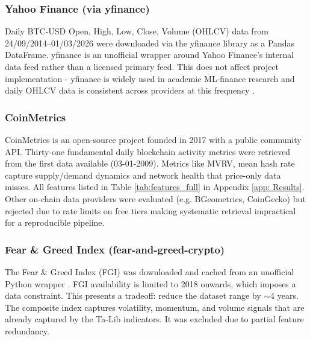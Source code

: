 \subsubsection{Yahoo Finance (via yfinance)}
\label{subsubsec: yfinance}
Daily BTC-USD Open, High, Low, Close, Volume (OHLCV) data from 24/09/2014–01/03/2026 were downloaded via the yfinance library as a Pandas DataFrame. yfinance is an unofficial wrapper around Yahoo Finance's internal data feed rather than a licensed primary feed. This does not affect project implementation - yfinance is widely used in academic ML-finance research and daily OHLCV data is consistent across providers at this frequency \cite{chenAnalysisBitcoinPrice2023}.
\subsubsection{CoinMetrics}
\label{subsubsec: CoinMetrics}
CoinMetrics is an open-source project founded in 2017 with a public community API. Thirty-one fundamental daily blockchain activity metrics were retrieved \cite{coinMetrics} from the first data available (03-01-2009). Metrics like MVRV, mean hash rate capture supply/demand dynamics and network health that price-only data misses. All features listed in Table \ref{tab:features_full} in Appendix \ref{app: Results}.
Other on-chain data providers were evaluated (e.g. BGeometrics, CoinGecko) but rejected due to rate limits on free tiers making systematic retrieval impractical for a reproducible pipeline.
\subsubsection{Fear \& Greed Index (fear-and-greed-crypto)}
\label{subsubsec: FGI}
The Fear \& Greed Index (FGI) was downloaded and cached from an unofficial Python wrapper \cite{reismanRhettreFearandgreedcrypto2026}. FGI availability is limited to 2018 onwards, which imposes a data constraint. This presents a tradeoff: reduce the dataset range by $\sim$4 years. The composite index captures volatility, momentum, and volume signals that are already captured by the Ta-Lib indicators. It was excluded due to partial feature redundancy. 
